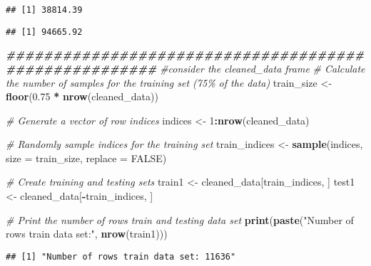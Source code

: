 \documentclass[
]{article}
\newenvironment{Shaded}{\begin{snugshade}}{\end{snugshade}}
\newcommand{\AttributeTok}[1]{\textcolor[rgb]{0.13,0.29,0.53}{#1}}
\newcommand{\CommentTok}[1]{\textcolor[rgb]{0.56,0.35,0.01}{\textit{#1}}}
\newcommand{\ConstantTok}[1]{\textcolor[rgb]{0.56,0.35,0.01}{#1}}
\newcommand{\DecValTok}[1]{\textcolor[rgb]{0.00,0.00,0.81}{#1}}
\newcommand{\DocumentationTok}[1]{\textcolor[rgb]{0.56,0.35,0.01}{\textbf{\textit{#1}}}}
\newcommand{\FloatTok}[1]{\textcolor[rgb]{0.00,0.00,0.81}{#1}}
\newcommand{\FunctionTok}[1]{\textcolor[rgb]{0.13,0.29,0.53}{\textbf{#1}}}
\newcommand{\NormalTok}[1]{#1}
\newcommand{\OtherTok}[1]{\textcolor[rgb]{0.56,0.35,0.01}{#1}}
\newcommand{\SpecialCharTok}[1]{\textcolor[rgb]{0.81,0.36,0.00}{\textbf{#1}}}
\newcommand{\StringTok}[1]{\textcolor[rgb]{0.31,0.60,0.02}{#1}}
\begin{document}
\begin{verbatim}
## [1] 38814.39
\end{verbatim}

\begin{Shaded}
\end{Shaded}

\begin{verbatim}
## [1] 94665.92
\end{verbatim}

\begin{Shaded}
\begin{Highlighting}[]
\DocumentationTok{\#\#\#\#\#\#\#\#\#\#\#\#\#\#\#\#\#\#\#\#\#\#\#\#\#\#\#\#\#\#\#\#\#\#\#\#\#\#\#\#\#\#\#\#\#\#\#\#\#\#\#\#\#\#}
\CommentTok{\#consider the cleaned\_data frame}
\CommentTok{\# Calculate the number of samples for the training set (75\% of the data)}
\NormalTok{train\_size }\OtherTok{\textless{}{-}} \FunctionTok{floor}\NormalTok{(}\FloatTok{0.75} \SpecialCharTok{*} \FunctionTok{nrow}\NormalTok{(cleaned\_data))}

\CommentTok{\# Generate a vector of row indices}
\NormalTok{indices }\OtherTok{\textless{}{-}} \DecValTok{1}\SpecialCharTok{:}\FunctionTok{nrow}\NormalTok{(cleaned\_data)}

\CommentTok{\# Randomly sample indices for the training set}
\NormalTok{train\_indices }\OtherTok{\textless{}{-}} \FunctionTok{sample}\NormalTok{(indices, }\AttributeTok{size =}\NormalTok{ train\_size, }\AttributeTok{replace =} \ConstantTok{FALSE}\NormalTok{)}

\CommentTok{\# Create training and testing sets}
\NormalTok{train1 }\OtherTok{\textless{}{-}}\NormalTok{ cleaned\_data[train\_indices, ]}
\NormalTok{test1 }\OtherTok{\textless{}{-}}\NormalTok{ cleaned\_data[}\SpecialCharTok{{-}}\NormalTok{train\_indices, ]}

\CommentTok{\# Print the number of rows train and testing data set}
\FunctionTok{print}\NormalTok{(}\FunctionTok{paste}\NormalTok{(}\StringTok{"Number of rows train data set:"}\NormalTok{, }\FunctionTok{nrow}\NormalTok{(train1)))}
\end{Highlighting}
\end{Shaded}

\begin{verbatim}
## [1] "Number of rows train data set: 11636"
\end{verbatim}
\end{document}
